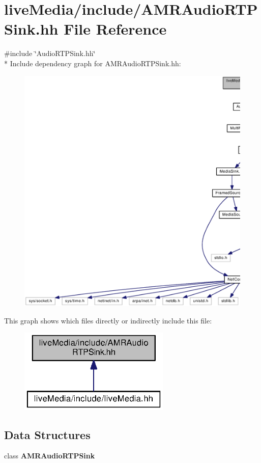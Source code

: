 \section{live\+Media/include/\+A\+M\+R\+Audio\+R\+T\+P\+Sink.hh File Reference}
\label{AMRAudioRTPSink_8hh}
{\ttfamily \#include \char`\"{}Audio\+R\+T\+P\+Sink.\+hh\char`\"{}}\\*
Include dependency graph for A\+M\+R\+Audio\+R\+T\+P\+Sink.\+hh\+:
\nopagebreak
\begin{figure}[H]
\begin{center}
\leavevmode
\includegraphics[width=350pt]{AMRAudioRTPSink_8hh__incl}
\end{center}
\end{figure}
This graph shows which files directly or indirectly include this file\+:
\nopagebreak
\begin{figure}[H]
\begin{center}
\leavevmode
\includegraphics[width=204pt]{AMRAudioRTPSink_8hh__dep__incl}
\end{center}
\end{figure}
\subsection*{Data Structures}
\begin{DoxyCompactItemize}
\item 
class {\bf A\+M\+R\+Audio\+R\+T\+P\+Sink}
\end{DoxyCompactItemize}
